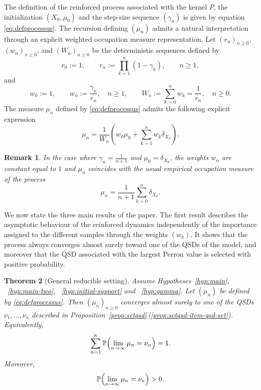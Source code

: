 \documentclass[10pt,letterpaper]{article}
\theoremstyle{compactplain}
\newtheorem{theorem}{Theorem}
\theoremstyle{compactdefinition}
\newtheorem{remark}[theorem]{Remark}
\renewcommand{\Pr}{\mathbb P}
\newcommand{\1}{\mathds{1}}
\begin{document}
\medskip

The definition of the reinforced process associated with the kernel $P$, the initialization $(X_0,\mu_0)$ and the step-size sequence $(\gamma_n)$ is given by equation \eqref{eq:defprocessus}. 
The recursion defining \((\mu_n)\) admits a natural interpretation through an
explicit weighted occupation measure representation. Let
\((r_n)_{n\geq0}\), \((w_n)_{n\geq0}\), and \((W_n)_{n\geq0}\) be the deterministic
sequences defined by
\begin{equation}
\label{eq:defrn}
r_0:=1,
\qquad
r_n:=\prod_{k=1}^n(1-\gamma_k),
\qquad n\geq1,
\end{equation}
and
\begin{equation}
\label{eq:defwn}
w_0:=1,
\qquad
w_n:=\frac{\gamma_n}{r_n},
\quad n\geq1,
\qquad
W_n:=\sum_{k=0}^n w_k=\frac1{r_n},
\quad n\geq0.
\end{equation}
The measure \(\mu_n\) defined by \eqref{eq:defprocessus} admits the following explicit expression
\begin{equation}
\label{eq:expressionexplicitemu}
\mu_n
=
\frac1{W_n}
\left(
w_0\mu_0+\sum_{k=1}^n w_k\delta_{X_k}
\right).
\end{equation}



\begin{remark} \label{rem:casusuel}
    In the case where $\gamma_n=\frac{1}{n+1}$ and $\mu_0=\delta_{X_0}$, the weights $w_n$ are constant equal to $1$ and \(\mu_n\) coincides with the usual empirical occupation measure of the process
\[
\mu_n=\frac1{n+1}\sum_{k=0}^n\delta_{X_k}.
\]
\end{remark}


We now state the three main results of the paper. The first result describes the asymptotic behaviour of the reinforced dynamics independently of the importance assigned to the different samples through the weights \((w_k)\). It shows that the process always converges almost surely toward one of the QSDs of the model, and moreover that the QSD associated with the largest Perron value is selected with positive probability.

\begin{theorem}[General reducible setting]
\label{th:main}
Assume Hypotheses~\ref{hyp:main}, ~\ref{hyp:main-two}, ~\ref{hyp:initial-support} and ~\ref{hyp:gamma}. Let \((\mu_n)\) be defined by \eqref{eq:defprocessus}. Then \((\mu_n)_{n\geq0}\) converges almost surely to one of the QSDs \(\nu_1,\ldots,\nu_\kappa\) described in
Proposition~\ref{prop:setqsd}\,\textup{(\ref{prop:setqsd-item-qsd-set})}. Equivalently,
\[
\sum_{\alpha=1}^{\kappa}
\Pr\Bigl(\lim_{n\to\infty}\mu_n=\nu_\alpha\Bigr)=1.
\]
Moreover,
\[
\Pr\Bigl(\lim_{n\to\infty}\mu_n=\nu_\kappa\Bigr)>0.
\]
\end{theorem}
\end{document}

